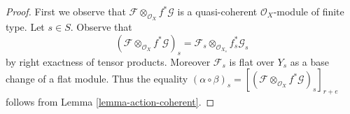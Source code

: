\documentclass{stacks-project}
\theoremstyle{plain}
\theoremstyle{definition}
\theoremstyle{remark}
\numberwithin{equation}{subsection}
\begin{document}
\begin{proof}
First we observe that $\mathcal{F} \otimes_{\mathcal{O}_X} f^*\mathcal{G}$
is a quasi-coherent $\mathcal{O}_X$-module of finite type.
Let $s \in S$. Observe that
$$
(\mathcal{F} \otimes_{\mathcal{O}_X} f^*\mathcal{G})_s =
\mathcal{F}_s \otimes_{\mathcal{O}_{X_s}} f_s^*\mathcal{G}_s
$$
by right exactness of tensor products. Moreover $\mathcal{F}_s$
is flat over $Y_s$ as a base change of a flat module. Thus the equality
$(\alpha \circ \beta)_s =
[(\mathcal{F} \otimes_{\mathcal{O}_X} f^*\mathcal{G})_s]_{r + e}$
follows from Lemma \ref{lemma-action-coherent}.
\end{proof}
\end{document}

